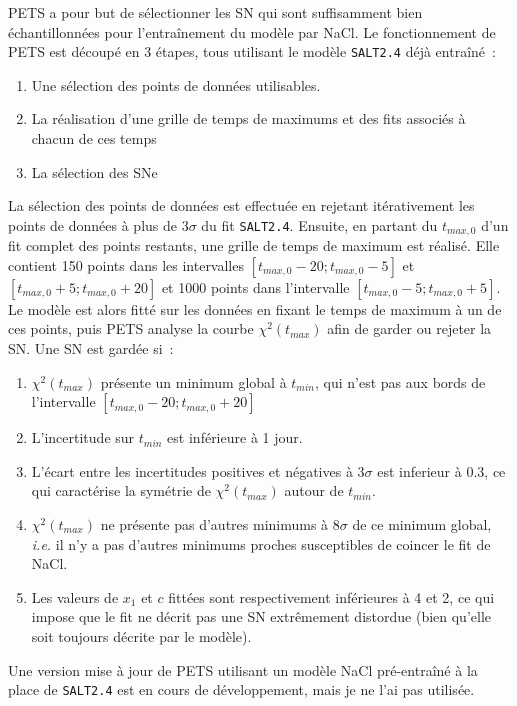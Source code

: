 \documentclass{book}
\def\saltd{\texttt{SALT2.4}\xspace}
\begin{document}
PETS a pour but de sélectionner les SN qui sont suffisamment bien échantillonnées pour l'entraînement du modèle par NaCl.
Le fonctionnement de PETS est découpé en 3 étapes, tous utilisant le modèle \saltd déjà entraîné~:
\begin{enumerate}
\item Une sélection des points de données utilisables.
\item La réalisation d'une grille de temps de maximums et des fits associés à chacun de ces temps
\item La sélection des SNe
\end{enumerate}

La sélection des points de données est effectuée en rejetant itérativement les points de données à plus de 3$\sigma$ du fit \saltd. Ensuite, en partant du $t_{max, 0}$ d'un fit complet des points restants, une grille de temps de maximum est réalisé. Elle contient 150 points dans les intervalles $[t_{max, 0} - 20 ; t_{max, 0} - 5]$ et $[t_{max, 0} +5; t_{max, 0} + 20]$ et 1000 points dans l'intervalle $[t_{max, 0} - 5 ; t_{max, 0} + 5]$. Le modèle est alors fitté sur les données en fixant le temps de maximum à un de ces points, puis PETS analyse la courbe $\chi^2(t_{max})$ afin de garder ou rejeter la SN. Une SN est gardée si~:
\begin{enumerate}
\item $\chi^2(t_{max})$ présente un minimum global à $t_{min}$, qui n'est pas aux bords de l'intervalle $[t_{max,0} - 20 ; t_{max, 0} + 20]$
\item L'incertitude sur $t_{min}$ est inférieure à 1 jour.
\item L'écart entre les incertitudes positives et négatives à 3$\sigma$ est inferieur à $0.3$, ce qui caractérise la symétrie de $\chi^2(t_{max})$ autour de $t_{min}$.
\item $\chi^2(t_{max})$ ne présente pas d'autres minimums à 8$\sigma$ de ce minimum global, \textit{i.e.} il n'y a pas d'autres minimums proches susceptibles de coincer le fit de NaCl.
\item Les valeurs de $x_1$ et $c$ fittées sont respectivement inférieures à 4 et 2, ce qui impose que le fit ne décrit pas une SN extrêmement distordue (bien qu'elle soit toujours décrite par le modèle).
\end{enumerate}

Une version mise à jour de PETS utilisant un modèle NaCl pré-entraîné à la place de \saltd est en cours de développement, mais je ne l'ai pas utilisée.
\end{document}
